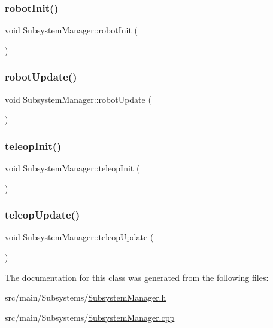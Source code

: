 \subsubsection{\texorpdfstring{robot\+Init()}{robotInit()}}
{\footnotesize\ttfamily void Subsystem\+Manager\+::robot\+Init (\begin{DoxyParamCaption}{ }\end{DoxyParamCaption})}

\mbox{\label{classSubsystemManager_a57f64def0b021ce8901cf1dfe1046256}} 
\subsubsection{\texorpdfstring{robot\+Update()}{robotUpdate()}}
{\footnotesize\ttfamily void Subsystem\+Manager\+::robot\+Update (\begin{DoxyParamCaption}{ }\end{DoxyParamCaption})}

\mbox{\label{classSubsystemManager_a78e19880c05e4e2219bb5b8cf40607da}} 
\subsubsection{\texorpdfstring{teleop\+Init()}{teleopInit()}}
{\footnotesize\ttfamily void Subsystem\+Manager\+::teleop\+Init (\begin{DoxyParamCaption}{ }\end{DoxyParamCaption})}

\mbox{\label{classSubsystemManager_ac55642f09846465e4482af14d835d98e}} 
\subsubsection{\texorpdfstring{teleop\+Update()}{teleopUpdate()}}
{\footnotesize\ttfamily void Subsystem\+Manager\+::teleop\+Update (\begin{DoxyParamCaption}{ }\end{DoxyParamCaption})}



The documentation for this class was generated from the following files\+:\begin{DoxyCompactItemize}
\item 
src/main/\+Subsystems/\hyperlink{SubsystemManager_8h}{Subsystem\+Manager.\+h}\item 
src/main/\+Subsystems/\hyperlink{SubsystemManager_8cpp}{Subsystem\+Manager.\+cpp}\end{DoxyCompactItemize}
